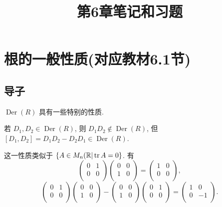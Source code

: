 \documentclass[color=black,device=normal,lang=cn,mode=geye]{elegantnote}
\title{第6章笔记和习题}
\begin{document}
\maketitle
\section{根的一般性质(对应教材6.1节)}
\subsection{导子}
$\operatorname{Der}(R)$ 具有一些特别的性质.
\begin{example}
    若 $D_1,D_2\in\operatorname{Der}(R)$, 则 $D_1D_2\notin\operatorname{Der}(R)$, 但 $[D_1,D_2]=D_1D_2-D_2D_1\in\operatorname{Der}(R)$.

    这一性质类似于 $\{A\in M_n(\mathbb{R}|\operatorname{tr} A=0\}$. 有
    \[\begin{pmatrix}
        0 & 1 \\
        0 & 0 \\
    \end{pmatrix}\begin{pmatrix}
        0 & 0 \\
        1 & 0 \\
    \end{pmatrix}=\begin{pmatrix}
        1 & 0 \\
        0 & 0 \\
    \end{pmatrix},\]
    \[\begin{pmatrix}
        0 & 1 \\
        0 & 0 \\
    \end{pmatrix}\begin{pmatrix}
        0 & 0 \\
        1 & 0 \\
    \end{pmatrix}-\begin{pmatrix}
        0 & 0 \\
        1 & 0 \\
    \end{pmatrix}\begin{pmatrix}
        0 & 1 \\
        0 & 0 \\
    \end{pmatrix}=\begin{pmatrix}
        1 & 0 \\
        0 & -1 \\
    \end{pmatrix}.\]
\end{example}
\end{document}
